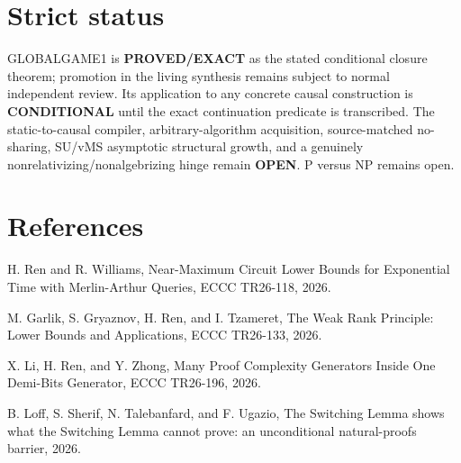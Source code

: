\documentclass[11pt]{article}
\begin{document}
\section*{Strict status}
GLOBALGAME1 is \textbf{PROVED/EXACT} as the stated conditional closure theorem; promotion in the living synthesis remains subject to normal independent review. Its application to any concrete causal construction is \textbf{CONDITIONAL} until the exact continuation predicate is transcribed. The static-to-causal compiler, arbitrary-algorithm acquisition, source-matched no-sharing, SU/vMS asymptotic structural growth, and a genuinely nonrelativizing/nonalgebrizing hinge remain \textbf{OPEN}. P versus NP remains open.

\section*{References}
H. Ren and R. Williams, Near-Maximum Circuit Lower Bounds for Exponential Time with Merlin-Arthur Queries, ECCC TR26-118, 2026.

M. Garlik, S. Gryaznov, H. Ren, and I. Tzameret, The Weak Rank Principle: Lower Bounds and Applications, ECCC TR26-133, 2026.

X. Li, H. Ren, and Y. Zhong, Many Proof Complexity Generators Inside One Demi-Bits Generator, ECCC TR26-196, 2026.

B. Loff, S. Sherif, N. Talebanfard, and F. Ugazio, The Switching Lemma shows what the Switching Lemma cannot prove: an unconditional natural-proofs barrier, 2026.
\end{document}
